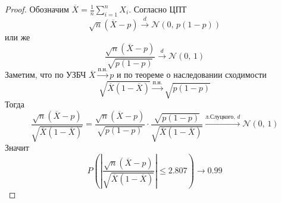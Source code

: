 \begin{proof}
  Обозначим $\overline{X} = \frac{1}{n}\sum_{i = 1}^n X_i$. Согласно ЦПТ
  \[\sqrt{n}(\overline{X} - p) \stackrel{d}{\to} \mathcal{N}(0,\, p(1 - p))\]
  или же
  \[\frac{\sqrt{n}(\overline{X} - p)}{\sqrt{p(1 - p)}} \stackrel{d}{\to} \mathcal{N}(0,\,1)\]
  Заметим, что по УЗБЧ $\overline{X} \stackrel{\text{п.н.}}{\to} p$ и по теореме о наследовании сходимости
  \[\sqrt{\overline{X}(1 - \overline{X})} \stackrel{\text{п.н.}}{\to} \sqrt{p(1 - p)}\]
  Тогда
  \[\frac{\sqrt{n}(\overline{X} - p)}{\sqrt{\overline{X}(1 - \overline{X})}} = \frac{\sqrt{n}(\overline{X} - p)}{\sqrt{p(1 - p)}}\cdot\frac{\sqrt{p(1 - p)}}{\sqrt{\overline{X}(1 - \overline{X})}} \stackrel{\text{л.Слуцкого},\, d}{\to}\mathcal{N}(0,\,1)\]
  Значит
  \[P\left(\left|\frac{\sqrt{n}(\overline{X} - p)}{\sqrt{\overline{X}(1 - \overline{X})}}\right| \leq 2.807\right) \to 0.99\]
\end{proof}

